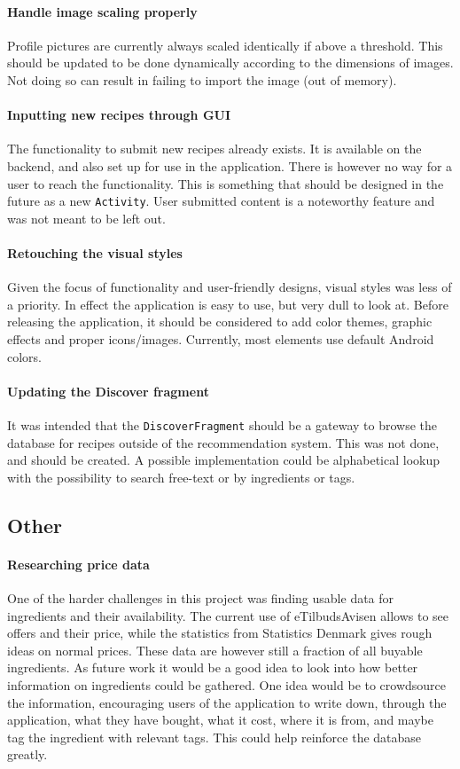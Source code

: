 \paragraph{Handle image scaling properly}
Profile pictures are currently always scaled identically if above a threshold. This should be updated to be done dynamically according to the dimensions of images. Not doing so can result in failing to import the image (out of memory).

\paragraph{Inputting new recipes through GUI}
The functionality to submit new recipes already exists. It is available on the backend, and also set up for use in the application. There is however no way for a user to reach the functionality. This is something that should be designed in the future as a new \texttt{Activity}. User submitted content is a noteworthy feature and was not meant to be left out.

\paragraph{Retouching the visual styles}
Given the focus of functionality and user-friendly designs, visual styles was less of a priority. In effect the application is easy to use, but very dull to look at. Before releasing the application, it should be considered to add color themes, graphic effects and proper icons/images. Currently, most elements use default Android colors.

\paragraph{Updating the Discover fragment}
It was intended that the \texttt{DiscoverFragment} should be a gateway to browse the database for recipes outside of the recommendation system. This was not done, and should be created. A possible implementation could be alphabetical lookup with the possibility to search free-text or by ingredients or tags.

\subsection{Other}

\paragraph{Researching price data}
One of the harder challenges in this project was finding usable data for ingredients and their availability. The current use of eTilbudsAvisen allows to see offers and their price, while the statistics from Statistics Denmark gives rough ideas on normal prices.
These data are however still a fraction of all buyable ingredients. As future work it would be a good idea to look into how better information on ingredients could be gathered.
One idea would be to crowdsource the information, encouraging users of the application to write down, through the application, what they have bought, what it cost, where it is from, and maybe tag the ingredient with relevant tags. This could help reinforce the database greatly.